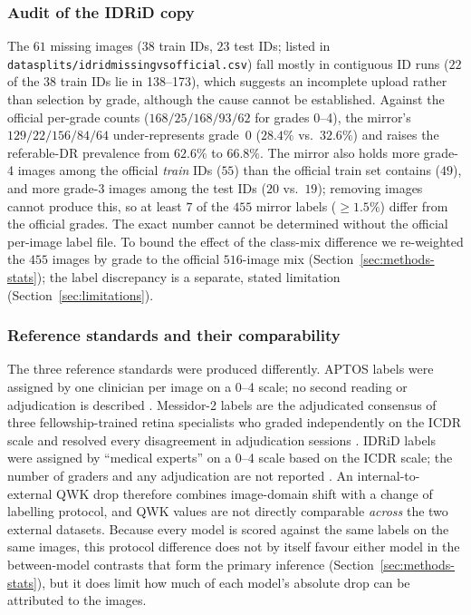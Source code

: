 \documentclass[journal]{IEEEtran}
\renewcommand{\_}{\origunderscore\allowbreak}
\begin{document}
\subsubsection{Audit of the IDRiD copy}
\label{sec:methods-idrid}
The $61$ missing images ($38$ train IDs, $23$ test IDs; listed in
\texttt{data\_splits/\allowbreak{}idrid\_missing\_vs\_official.csv}) fall mostly in
contiguous ID runs ($22$ of the $38$ train IDs lie in 138--173), which suggests
an incomplete upload rather than selection by grade, although the cause cannot
be established. Against the official per-grade counts ($168/25/168/93/62$ for
grades 0--4), the mirror's $129/22/156/84/64$ under-represents grade~0
($28.4\%$ vs.\ $32.6\%$) and raises the referable-DR prevalence from $62.6\%$ to
$66.8\%$. The mirror also holds more grade-4 images among the official
\emph{train} IDs ($55$) than the official train set contains ($49$), and more
grade-3 images among the test IDs ($20$ vs.\ $19$); removing images cannot
produce this, so at least $7$ of the $455$ mirror labels ($\geq 1.5\%$) differ
from the official grades. The exact number cannot be determined without the
official per-image label file. To bound the effect of the class-mix
difference we re-weighted the $455$ images by grade to the official $516$-image
mix (Section~\ref{sec:methods-stats}); the label discrepancy is a separate,
stated limitation (Section~\ref{sec:limitations}).

\subsubsection{Reference standards and their comparability}
\label{sec:methods-refstd}
The three reference standards were produced differently. APTOS labels were
assigned by one clinician per image on a 0--4 scale; no second reading or
adjudication is described \cite{aptos2019}. Messidor-2 labels are the
adjudicated consensus of three fellowship-trained retina specialists who graded
independently on the ICDR scale and resolved every disagreement in adjudication
sessions \cite{krause2018}. IDRiD labels were assigned by ``medical experts''
on a 0--4 scale based on the ICDR scale; the number of graders and any
adjudication are not reported \cite{porwal2018}. An internal-to-external QWK drop
therefore combines image-domain shift with a change of labelling protocol, and
QWK values are not directly comparable \emph{across} the two external datasets.
Because every model is scored against the same labels on the same images, this
protocol difference does not by itself favour either model in the
between-model contrasts that form the primary inference
(Section~\ref{sec:methods-stats}), but it does limit how much of each model's
absolute drop can be attributed to the images.
\end{document}
